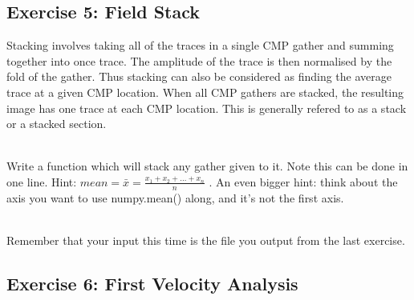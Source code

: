 \documentclass[a4paper, 10pt]{article}
\begin{document}
\subsection*{Exercise 5: Field Stack}
Stacking involves taking all of the traces in a single CMP gather and summing together into once trace.  The amplitude of the trace is then normalised by the fold of the gather.  Thus stacking can also be considered as finding the average trace at a given CMP location.  When all CMP gathers are stacked, the resulting image has one trace at each CMP location.  This is generally refered to as a stack or a stacked section.
\par~\\
Write a function which will stack any gather given to it.  Note this can be done in one line. Hint: $mean = \bar{x} = \frac{x_1 + x_2 + \ldots + x_n}{n}$ . An even bigger hint: think about the axis you want to use numpy.mean() along, and it's not the first axis.
\par~\\
Remember that your input this time is the file you output from the last exercise.  

\subsection*{Exercise 6: First Velocity Analysis}
\end{document}
